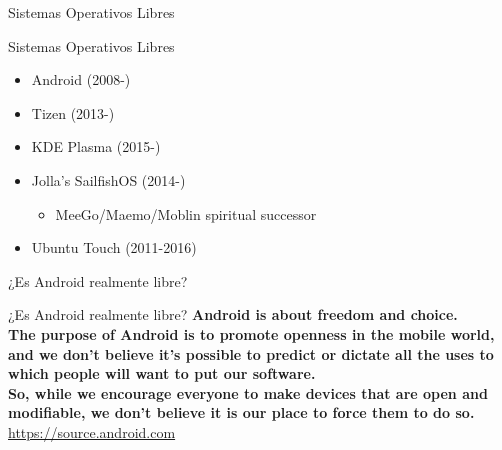 \begin{frame}
    \centering
    \Huge{Sistemas Operativos Libres}
\end{frame}

\begin{frame}{Sistemas Operativos Libres}
    \begin{itemize}
        \item Android (2008-)
        \pause
        \item Tizen (2013-)
        \pause
        \item KDE Plasma (2015-)
        \pause
        \item Jolla's SailfishOS (2014-)
            \pause
            \begin{itemize}
                \item MeeGo/Maemo/Moblin spiritual successor
            \end{itemize}
            \pause
        \item Ubuntu Touch (2011-2016)
    \end{itemize}
\end{frame}

\begin{frame}
    \centering
    \Huge{¿Es Android realmente libre?}
\end{frame}

\begin{frame}{¿Es Android realmente libre?}
    \textbf{Android is about freedom and choice.\\
				The purpose of Android is to promote openness in the mobile world, and we don't believe it's possible to predict or dictate all the uses to which people will want to put our software.\\
				So, while we encourage everyone to make devices that are open and modifiable, we don't believe it is our place to force them to do so.
    }
    \url{https://source.android.com}
\end{frame}

